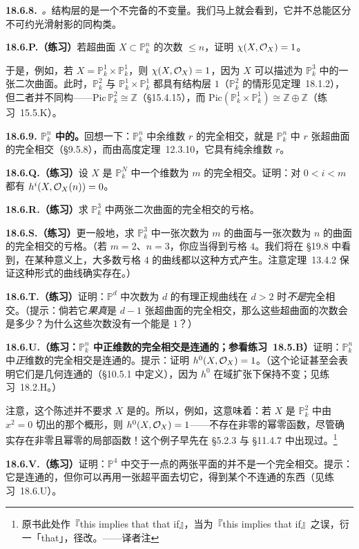 \textbf{18.6.8.}\ \emph{\trhCaveat{}。}\quad 结构层的\trEulerCharacteristic{}是一个不完备的不变量。我们马上就会看到，它并不总能区分不可约光滑射影\trVariety{}的同构类。

\textbf{18.6.P.（练习）}\quad 若超曲面 $X\subset\mathbb{P}^n_k$ 的次数 $\le n$，证明 $\chi(X,\mathcal{O}_X)=1$。

于是，例如，若 $X=\mathbb{P}^1_k\times\mathbb{P}^1_k$，则 $\chi(X,\mathcal{O}_X)=1$，因为 $X$ 可以描述为 $\mathbb{P}^3_k$ 中的一张二次曲面。此时，$\mathbb{P}^2_k$ 与 $\mathbb{P}^1_k\times\mathbb{P}^1_k$ 都具有结构层\trEulerCharacteristic{} $1$（$\mathbb{P}^2_k$ 的情形见\mbox{定理~18.1.2}），但二者并不同构——$\mathrm{Pic}\,\mathbb{P}^2_k\cong\mathbb{Z}$（\S15.4.15），而 $\mathrm{Pic}(\mathbb{P}^1_k\times\mathbb{P}^1_k)\cong\mathbb{Z}\oplus\mathbb{Z}$（\mbox{练习~15.5.K}）。

\textbf{18.6.9. $\mathbb{P}^n_k$ 中的\trCompleteIntersection。}\quad 回想一下：$\mathbb{P}^n_k$ 中余维数 $r$ 的完全相交，就是 $\mathbb{P}^n_k$ 中 $r$ 张超曲面的完全相交（\S9.5.8），而由\trKrull{}高度定理~\mbox{12.3.10}，它具有纯余维数 $r$。

\textbf{18.6.Q.（练习）}\quad 设 $X$ 是 $\mathbb{P}^N_k$ 中一个维数为 $m$ 的完全相交。证明：对 $0<i<m$ 都有 $h^i(X,\mathcal{O}_X(n))=0$。

\textbf{18.6.R.（练习）}\quad 求 $\mathbb{P}^3_k$ 中两张二次曲面的完全相交的亏格。

\textbf{18.6.S.（练习）}\quad 更一般地，求 $\mathbb{P}^3_k$ 中一张次数为 $m$ 的曲面与一张次数为 $n$ 的曲面的完全相交的亏格。（若 $m=2$、$n=3$，你应当得到亏格 $4$。我们将在 \S19.8 中看到，在某种意义上，大多数亏格 $4$ 的曲线都以这种方式产生。注意\trBertini{}定理~\mbox{13.4.2} 保证这种形式的\trRegular{}曲线确实存在。）

\textbf{18.6.T.（练习）}\quad 证明：$\mathbb{P}^d$ 中次数为 $d$ 的有理正规曲线在 $d>2$ 时\emph{不是}完全相交。（提示：倘若它\emph{果真}是 $d-1$ 张超曲面的完全相交，那么这些超曲面的次数会是多少？为什么这些次数没有一个能是 $1$？）

\textbf{18.6.U.（练习：$\mathbb{P}^n_k$ 中正维数的完全相交是连通的；参看\mbox{练习~18.5.B}）}\quad 证明：$\mathbb{P}^n_k$ 中\emph{正}维数的完全相交是连通的。提示：证明 $h^0(X,\mathcal{O}_X)=1$。（这个论证甚至会表明它们是几何连通的（\S10.5.1 中定义），因为 $h^0$ 在域扩张下保持不变；见\mbox{练习~18.2.H}。）

注意，这个陈述并不要求 $X$ 是\trReduced{}的。所以，例如，这意味着：若 $X$ 是 $\mathbb{P}^2_k$ 中由 $x^2=0$ 切出的那个概形，则 $h^0(X,\mathcal{O}_X)=1$——不存在非零的幂零函数，尽管确实存在非零且幂零的局部函数！这个例子早先在 \S5.2.3 与 \S11.4.7 中出现过。\footnote{原书此处作『this implies that that if』，当为『this implies that if』之误，衍一「that」，径改。——译者注}

\textbf{18.6.V.（练习）}\quad 证明：$\mathbb{P}^4$ 中交于一点的两张平面的并不是一个完全相交。提示：它是连通的，但你可以再用一张超平面去切它，得到某个不连通的东西（见\mbox{练习~18.6.U}）。
